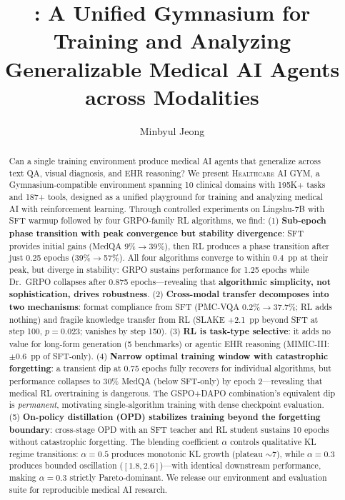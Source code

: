 \documentclass{article}
\title{\gym{}: A Unified Gymnasium for Training and Analyzing \\
Generalizable Medical AI Agents across Modalities}
\author{%
  Minbyul Jeong \\
}
\newcommand{\gym}{\textsc{Healthcare AI GYM}}
\begin{document}
\maketitle

\begin{abstract}
Can a single training environment produce medical AI agents that generalize across text QA, visual diagnosis, and EHR reasoning? We present \gym{}, a Gymnasium-compatible environment spanning 10 clinical domains with 195K+ tasks and 187+ tools, designed as a unified playground for training and analyzing medical AI with reinforcement learning. Through controlled experiments on Lingshu-7B with SFT warmup followed by four GRPO-family RL algorithms, we find: (1) \textbf{Sub-epoch phase transition with peak convergence but stability divergence}: SFT provides initial gains (MedQA 9\%$\to$39\%), then RL produces a phase transition after just 0.25 epochs (39\%$\to$57\%). All four algorithms converge to within 0.4~pp at their peak, but diverge in stability: GRPO sustains performance for 1.25 epochs while Dr.~GRPO collapses after 0.875 epochs---revealing that \textbf{algorithmic simplicity, not sophistication, drives robustness}. (2) \textbf{Cross-modal transfer decomposes into two mechanisms}: format compliance from SFT (PMC-VQA 0.2\%$\to$37.7\%; RL adds nothing) and fragile knowledge transfer from RL (SLAKE +2.1~pp beyond SFT at step 100, $p{=}0.023$; vanishes by step 150). (3) \textbf{RL is task-type selective}: it adds no value for long-form generation (5 benchmarks) or agentic EHR reasoning (MIMIC-III: $\pm$0.6~pp of SFT-only). (4) \textbf{Narrow optimal training window with catastrophic forgetting}: a transient dip at 0.75 epochs fully recovers for individual algorithms, but performance collapses to 30\% MedQA (below SFT-only) by epoch 2---revealing that medical RL overtraining is dangerous. The GSPO+DAPO combination's equivalent dip is \emph{permanent}, motivating single-algorithm training with dense checkpoint evaluation. (5) \textbf{On-policy distillation (OPD) stabilizes training beyond the forgetting boundary}: cross-stage OPD with an SFT teacher and RL student sustains 10 epochs without catastrophic forgetting. The blending coefficient $\alpha$ controls qualitative KL regime transitions: $\alpha{=}0.5$ produces monotonic KL growth (plateau ${\sim}7$), while $\alpha{=}0.3$ produces bounded oscillation ($[1.8, 2.6]$)---with identical downstream performance, making $\alpha{=}0.3$ strictly Pareto-dominant. We release our environment and evaluation suite for reproducible medical AI research.
\end{abstract}
\end{document}
